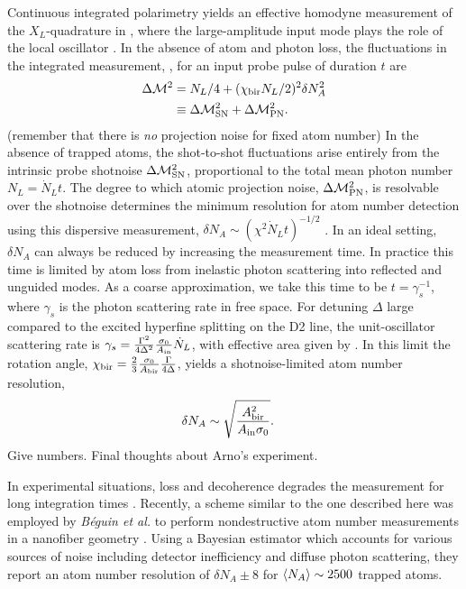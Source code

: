 \documentclass[preprint,aps,pra,onecolumn]{revtex4-1} %
\newcommand{\chibir}{\chi_{\rm bir}}
\newcommand{\shotnoise}{\Delta \mathcal{M}^2_{\rm SN}}
\newcommand{\projnoise}{\Delta \mathcal{M}^2_{\rm PN}}
\newcommand{\Abiref}{A_{\rm bir}}
\newcommand{\comment}[1]{{\color{Maroon} #1}}
\begin{document}
Continuous integrated polarimetry yields an effective homodyne measurement of the $X_L$-quadrature in , where the large-amplitude input mode plays the role of the local oscillator \cite{hammerer_quantum_2010}.  In the absence of atom and photon loss, the fluctuations in the integrated measurement, , for an input probe pulse of duration $t$ are 
	\begin{align}
		\Delta \mathcal{M}^2 &= N_L /4 + ( \chibir N_L /2 )^2 \delta N_A^2 \label{Eq::MeasurementVariance} \\
			&\equiv \shotnoise + \projnoise.
	\end{align}
\comment{(remember that there is \emph{no} projection noise for fixed atom number)} In the absence of trapped atoms, the shot-to-shot fluctuations arise entirely from the intrinsic probe shotnoise $\shotnoise$, proportional to the total mean photon number $N_L = \dot{N}_Lt$. The degree to which atomic projection noise, $\projnoise$, is resolvable over the shotnoise determines the minimum resolution for atom number detection using this dispersive measurement, $\delta N_A \sim ( \chi^2 \dot{N}_L t )^{-1/2}$ \cite{smith_faraday_2003}.  In an ideal setting, $\delta N_A$ can always be reduced by increasing the measurement time. In practice this time is limited by atom loss from inelastic photon scattering into reflected and unguided modes. As a coarse approximation, we take this time to be $t=\gamma_s^{-1}$, where $\gamma_s$ is the photon scattering rate in free space.  For detuning $\Delta$ large compared to the excited hyperfine splitting on the D2 line, the unit-oscillator scattering rate is $\gamma_s = \frac{\Gamma^2}{4 \Delta^2}\frac{\sigma_0 }{A_{\rm in}} \dot{N}_L $, with effective area given by .  In this limit the rotation angle, $\chibir = \frac{2}{3} \frac{\sigma_0}{\Abiref}\frac{\Gamma}{4\Delta}$, yields a shotnoise-limited atom number resolution, 
	\begin{align} \label{Eq::AtomNumberResolution}
		\delta N_A  &\sim \sqrt {\frac{\Abiref^2}{A_{\rm in} \sigma_0}}.
	\end{align}
\comment{Give numbers. Final thoughts about Arno's experiment.} 

In experimental situations, loss and decoherence degrades the measurement for long integration times \cite{dawkins_dispersive_2011, zhang_collective_2012}. Recently, a scheme similar to the one described here was employed by \emph{B\'{e}guin et al.} to perform nondestructive atom number measurements in a nanofiber geometry \cite{beguin_generation_2014}.  Using a Bayesian estimator which accounts for various sources of noise including detector inefficiency and diffuse photon scattering, they report an atom number resolution of $\delta N_A \pm 8$ for $\langle{N_A}\rangle\sim2500$ trapped atoms.  
\end{document}
